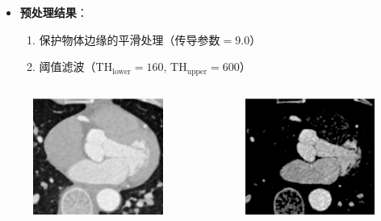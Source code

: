 \begin{frame}
\begin{itemize}
  \item \textbf{预处理结果}：
  \begin{enumerate}
     \item 保护物体边缘的平滑处理（$\text{传导参数} = 9.0$）
     \item 阈值滤波（$\text{TH}_{\text{lower}} = 160$, $\text{TH}_{\text{upper}} = 600$）
  \end{enumerate}
\end{itemize}
\begin{columns}[b,onlytextwidth]
\begin{column}{.5\textwidth}
 \begin{figure}
\centering
\includegraphics[height=1.5in]{../../Figures/coronary/smooth.eps}
\end{figure}
\end{column}
\begin{column}{.5\textwidth}
 \begin{figure}
\centering
\includegraphics[height=1.5in]{../../Figures/coronary/threshold.eps}
\end{figure}
\end{column}
\end{columns}
\end{frame}

